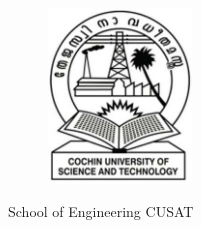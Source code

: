 \documentclass[12pt,b5paper]{report}
\begin{document}
\begin{center}


\vspace*{\fill}

\begin{figure}[htb]
    \centering
    \includegraphics[width=1.5in]{cusat.png}
\end{figure}

\vspace{1em}

\large{School of Engineering CUSAT}

\end{center}
\end{document}

